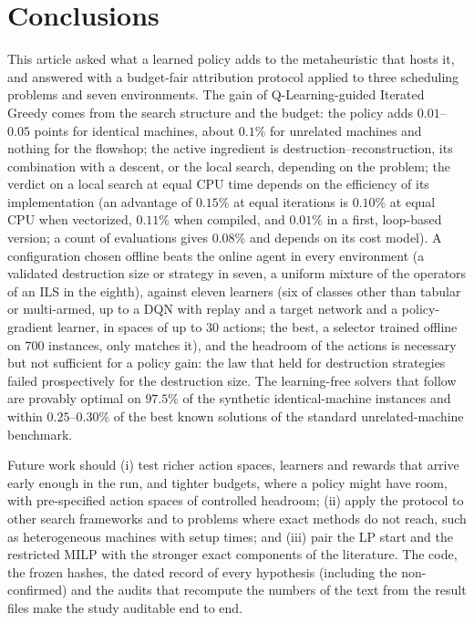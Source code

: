 \section{Conclusions}
\label{sec:conclusions}

This article asked what a learned policy adds to the metaheuristic that hosts it, and answered with a budget-fair attribution protocol applied to three scheduling problems and seven environments. The gain of Q-Learning-guided Iterated Greedy
comes from the search structure and the budget: the policy adds $0.01$--$0.05$ points for identical machines, about $0.1\%$ for unrelated machines and nothing for the flowshop; the active ingredient is
destruction--reconstruction, its combination with a descent, or the local search, depending on the problem; the verdict on a local search at equal CPU time depends on the efficiency of its implementation (an advantage of $0.15\%$ at equal iterations is $0.10\%$ at equal CPU when vectorized, $0.11\%$ when compiled, and $0.01\%$ in a first, loop-based version; a count of evaluations gives $0.08\%$ and depends on its cost model). A configuration chosen offline beats
the online agent in every environment (a validated destruction size or strategy in seven, a uniform mixture of the operators of an ILS in the eighth), against eleven learners (six of classes other than tabular or multi-armed, up to a DQN with replay and a target network and a policy-gradient learner, in spaces of up to $30$ actions; the best, a selector trained offline on $700$ instances, only matches it), and the headroom of the actions is necessary but not sufficient for a policy gain: the law that held for destruction strategies failed prospectively for the destruction size.
The learning-free solvers that follow are provably optimal on $97.5\%$ of the synthetic identical-machine instances and within $0.25$--$0.30\%$ of the best known solutions of the standard unrelated-machine benchmark.

Future work should (i) test richer action spaces, learners and rewards that arrive early enough in the run, and tighter budgets, where a policy might have room, with pre-specified action spaces of controlled headroom; (ii) apply the
protocol to other search frameworks and to problems where exact methods do not reach, such as heterogeneous machines with setup times; and (iii) pair the LP start and the restricted MILP with the stronger exact components of the literature.
The code, the frozen hashes, the dated record of every hypothesis (including the non-confirmed) and the audits that recompute the numbers of the text from the result files make the study auditable end to end.
